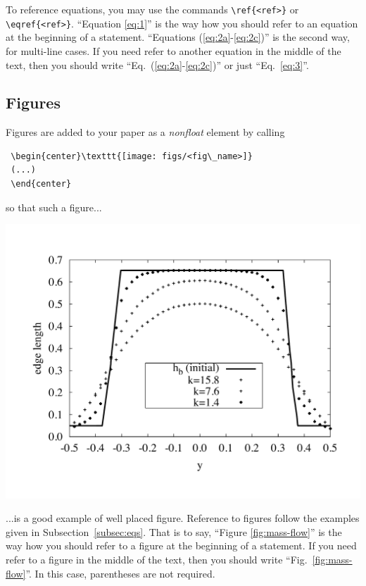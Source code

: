 \documentclass[date]{ppgem}
\begin{document}
\begin{multicols}{2}
To reference equations, you may use the commands \verb|\ref{<ref>}| or
\verb|\eqref{<ref>}|. ``Equation \eqref{eq:1}'' is the way how you
should refer to an equation at the beginning of a statement. ``Equations
(\ref{eq:2a}-\ref{eq:2c})'' is the second way, for multi-line cases. If
you need refer to another equation in the middle of the text, then you
should write ``Eq.~(\ref{eq:2a}-\ref{eq:2c})'' or just
``Eq.~\eqref{eq:3}''.

\subsection{Figures}

Figures are added to your paper as a \emph{nonfloat} element by calling

\begin{verbatim}
 \begin{center}\texttt{[image: figs/<fig\_name>]} 
 (...)
 \end{center}
\end{verbatim}

so that such a figure...

\begin{center}
 \captionsetup{type=figure}
 \includegraphics[scale=0.33]{figs/example}
 \label{fig:mass-flow}
\end{center}

...is a good example of well placed figure. Reference to figures follow
the examples given in Subsection~\ref{subsec:eqs}. That is to say,
``Figure \eqref{fig:mass-flow}'' is the way how you should refer to a
figure at the beginning of a statement. If you need refer to a figure in
the middle of the text, then you should write
``Fig.~\ref{fig:mass-flow}''. In this case, parentheses are not
required.


\end{multicols}
\end{document}
